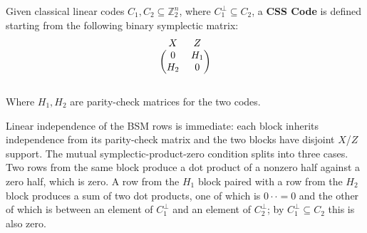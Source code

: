 \begin{definition}
    Given classical linear codes $C_1, C_2 \subseteq \mathbb{Z}_2^n$, where
    $C_1^\perp \subseteq C_2$, a \textbf{CSS Code} is defined starting from the
    following binary symplectic matrix:
$$
\begin{blockarray}{cc}
X & Z \\  %
\begin{block}{(cc)}
  0 & H_1 \\
  H_2 & 0 \\
\end{block}
\end{blockarray}
$$

Where $H_1, H_2$ are parity-check matrices for the two codes. 
\end{definition}

%
%
%

Linear independence of the BSM rows is immediate: each block inherits
independence from its parity-check matrix and the two blocks have disjoint
$X$/$Z$ support. The mutual symplectic-product-zero condition splits into three
cases. Two rows from the same block produce a dot product of a nonzero half
against a zero half, which is zero. A row from the $H_1$ block paired with a row
from the $H_2$ block produces a sum of two dot products, one of which is $0
\cdot \cdot = 0$ and the other of which is between an element of $C_1^\perp$ and
an element of $C_2^\perp$; by $C_1^\perp \subseteq C_2$ this is also zero.

